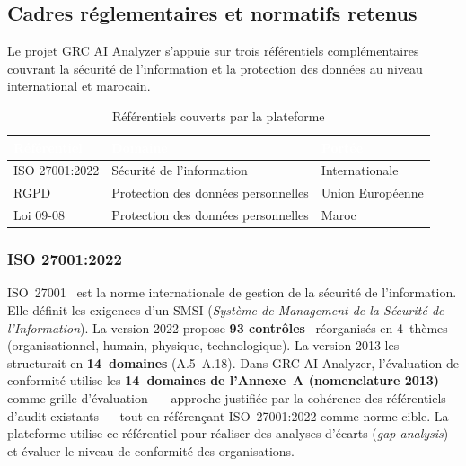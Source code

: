 \documentclass[a4paper,12pt,oneside]{report}
\newcommand{\colhead}[1]{\textcolor{white}{\bfseries #1}}
\newcommand{\headrow}{\rowcolor{headerblue}}
\begin{document}
	\subsection{Cadres r\'eglementaires et normatifs retenus}
	
	Le projet GRC AI Analyzer s'appuie sur trois r\'ef\'erentiels compl\'ementaires couvrant la s\'ecurit\'e de l'information et la protection des donn\'ees au niveau international et marocain.
	
	\begin{table}[ht]
		\centering
		\begin{tabular}{@{}lll@{}}
			\toprule
			\headrow \colhead{R\'ef\'erentiel} & \colhead{Domaine} & \colhead{Port\'ee} \\
			\midrule
			ISO 27001:2022 & S\'ecurit\'e de l'information & Internationale \\
			\rowcolor{rowalt} RGPD & Protection des donn\'ees personnelles & Union Europ\'eenne \\
			Loi 09-08 & Protection des donn\'ees personnelles & Maroc \\
			\bottomrule
		\end{tabular}
		\caption{R\'ef\'erentiels couverts par la plateforme}
	\end{table}
	
	\subsubsection*{ISO 27001:2022}
	ISO~27001~\cite{iso27001} est la norme internationale de gestion de la s\'ecurit\'e de l'information. Elle d\'efinit les exigences d'un SMSI (\textit{Syst\`eme de Management de la S\'ecurit\'e de l'Information}). La version 2022 propose \textbf{93 contr\^oles}~\cite{iso27002} r\'eorganis\'es en 4~th\`emes (organisationnel, humain, physique, technologique). La version 2013 les structurait en \textbf{14~domaines} (A.5--A.18). Dans GRC AI Analyzer, l'\'evaluation de conformit\'e utilise les \textbf{14~domaines de l'Annexe~A (nomenclature 2013)} comme grille d'\'evaluation~--- approche justifi\'ee par la coh\'erence des r\'ef\'erentiels d'audit existants --- tout en r\'ef\'eren\c{c}ant ISO~27001:2022 comme norme cible.  
	La plateforme utilise ce r\'ef\'erentiel pour r\'ealiser des analyses d'\'ecarts (\textit{gap analysis}) et \'evaluer le niveau de conformit\'e des organisations.
	
\end{document}
